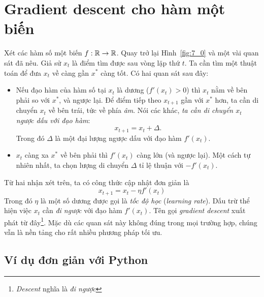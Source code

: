 \section{Gradient descent cho hàm một biến}
Xét các hàm số một biến $f: \mathbb{R} \rightarrow \mathbb{R}$. Quay trở lại Hình~\ref{fig:7_0}
và một vài quan sát đã nêu. Giả sử  $x_{t}$ là điểm tìm được sau vòng lặp thứ
$t$. Ta cần tìm một thuật toán để đưa $x_{t}$ về càng gần $x^*$ càng tốt. Có hai
quan sát sau đây:
\begin{itemize}
\item Nếu đạo hàm của hàm số tại $x_{t}$ là dương ($f'(x_{t}) > 0$) thì
$x_t$ nằm
về bên phải so với $x^*$, và ngược lại. Để điểm tiếp theo $x_{t+1}$ gần với
$x^*$ hơn, ta cần di chuyển $x_t$ về bên trái, tức về phía
\textit{âm}. Nói các khác, \textit{ta cần di chuyển $x_t$ ngược dấu với đạo hàm}:
\begin{equation}
x_{t+1} = x_t + \Delta.
\end{equation}
Trong đó $\Delta$ là một đại lượng ngược dấu với đạo hàm $f'(x_t)$.

\item $x_t$ càng xa $x^*$ về bên phải thì $f'(x_t)$ càng lớn (và
ngược lại). Một cách tự nhiên nhất, ta chọn lượng di chuyển $\Delta$ tỉ lệ
thuận với $-f'(x_t)$.
\end{itemize}
Từ hai nhận xét trên, ta có công thức cập nhật đơn giản là
\begin{equation}
\boxed{
x_{t+1} = x_t - \eta f'(x_t)
}
\end{equation}
Trong đó $\eta$ là một số dương được gọi là \textit{tốc độ học}
(\textit{learning rate}). Dấu trừ thể hiện việc $x_t$ cần \textit{đi ngược} với
đạo hàm $f'(x_t)$. Tên gọi \textit{gradient descent} xuất phát từ đây\footnote{
\textit{Descent} nghĩa là \textit{đi ngược}}. Mặc dù các quan sát này không đúng
trong mọi trường hợp, chúng vẫn là nền tảng cho rất nhiều phương pháp tối ưu.

\subsection{Ví dụ đơn giản với Python}

